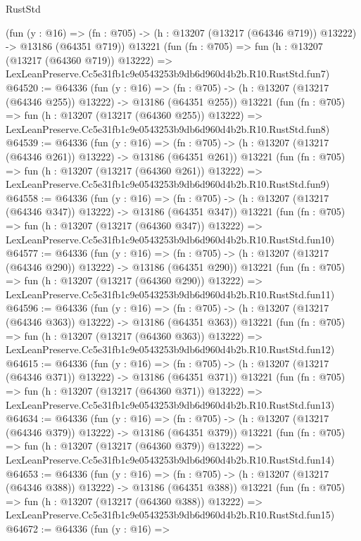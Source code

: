 \begin{lexlean}{RustStd}
\begin{coremodule}
    (fun (y : @16) =>
    (fn : @705) -> (h : @13207 (@13217 (@64346 @719)) @13222) -> @13186 (@64351 @719))
    @13221
    (fun (fn : @705) =>
    fun (h : @13207 (@13217 (@64360 @719)) @13222) =>
    LexLeanPreserve.Cc5e31fb1c9e0543253b9db6d960d4b2b.R10.RustStd.fun7)
@64520 := @64336
    (fun (y : @16) =>
    (fn : @705) -> (h : @13207 (@13217 (@64346 @255)) @13222) -> @13186 (@64351 @255))
    @13221
    (fun (fn : @705) =>
    fun (h : @13207 (@13217 (@64360 @255)) @13222) =>
    LexLeanPreserve.Cc5e31fb1c9e0543253b9db6d960d4b2b.R10.RustStd.fun8)
@64539 := @64336
    (fun (y : @16) =>
    (fn : @705) -> (h : @13207 (@13217 (@64346 @261)) @13222) -> @13186 (@64351 @261))
    @13221
    (fun (fn : @705) =>
    fun (h : @13207 (@13217 (@64360 @261)) @13222) =>
    LexLeanPreserve.Cc5e31fb1c9e0543253b9db6d960d4b2b.R10.RustStd.fun9)
@64558 := @64336
    (fun (y : @16) =>
    (fn : @705) -> (h : @13207 (@13217 (@64346 @347)) @13222) -> @13186 (@64351 @347))
    @13221
    (fun (fn : @705) =>
    fun (h : @13207 (@13217 (@64360 @347)) @13222) =>
    LexLeanPreserve.Cc5e31fb1c9e0543253b9db6d960d4b2b.R10.RustStd.fun10)
@64577 := @64336
    (fun (y : @16) =>
    (fn : @705) -> (h : @13207 (@13217 (@64346 @290)) @13222) -> @13186 (@64351 @290))
    @13221
    (fun (fn : @705) =>
    fun (h : @13207 (@13217 (@64360 @290)) @13222) =>
    LexLeanPreserve.Cc5e31fb1c9e0543253b9db6d960d4b2b.R10.RustStd.fun11)
@64596 := @64336
    (fun (y : @16) =>
    (fn : @705) -> (h : @13207 (@13217 (@64346 @363)) @13222) -> @13186 (@64351 @363))
    @13221
    (fun (fn : @705) =>
    fun (h : @13207 (@13217 (@64360 @363)) @13222) =>
    LexLeanPreserve.Cc5e31fb1c9e0543253b9db6d960d4b2b.R10.RustStd.fun12)
@64615 := @64336
    (fun (y : @16) =>
    (fn : @705) -> (h : @13207 (@13217 (@64346 @371)) @13222) -> @13186 (@64351 @371))
    @13221
    (fun (fn : @705) =>
    fun (h : @13207 (@13217 (@64360 @371)) @13222) =>
    LexLeanPreserve.Cc5e31fb1c9e0543253b9db6d960d4b2b.R10.RustStd.fun13)
@64634 := @64336
    (fun (y : @16) =>
    (fn : @705) -> (h : @13207 (@13217 (@64346 @379)) @13222) -> @13186 (@64351 @379))
    @13221
    (fun (fn : @705) =>
    fun (h : @13207 (@13217 (@64360 @379)) @13222) =>
    LexLeanPreserve.Cc5e31fb1c9e0543253b9db6d960d4b2b.R10.RustStd.fun14)
@64653 := @64336
    (fun (y : @16) =>
    (fn : @705) -> (h : @13207 (@13217 (@64346 @388)) @13222) -> @13186 (@64351 @388))
    @13221
    (fun (fn : @705) =>
    fun (h : @13207 (@13217 (@64360 @388)) @13222) =>
    LexLeanPreserve.Cc5e31fb1c9e0543253b9db6d960d4b2b.R10.RustStd.fun15)
@64672 := @64336
    (fun (y : @16) =>

\end{coremodule}
\end{lexlean}
